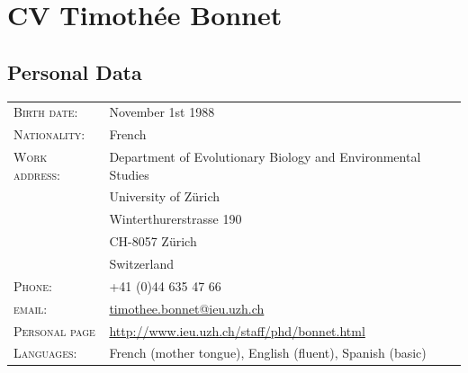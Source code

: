 \chapter[Curriculum Vitae]{CV Timoth\'{e}e Bonnet}

\section{Personal Data}
\begin{tabular}{p{4cm} p{11cm}}
\hfill \textsc{Birth date:} & November 1st 1988\\
\hfill \textsc{Nationality:} & French\\
\hfill \textsc{Work address:} & Department of Evolutionary Biology and Environmental Studies\\ 
									& University of Z\"{u}rich\\
									& Winterthurerstrasse 190\\
									& CH-8057 Z\"{u}rich\\
									& Switzerland \\
\hfill \textsc{Phone:} & +41 (0)44 635 47 66\\
\hfill \textsc{email:} & \href{mailto:timothee.bonnet@ieu.uzh.ch}{timothee.bonnet@ieu.uzh.ch}\\
\hfill \textsc{Personal page} & \url{http://www.ieu.uzh.ch/staff/phd/bonnet.html} \\
\hfill \textsc{Languages:} & French (mother tongue), English (fluent), Spanish (basic)
\end{tabular}


